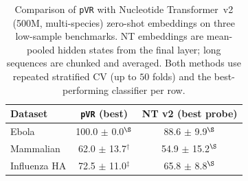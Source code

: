 \begin{table}[t]
\centering
\footnotesize
\caption{Comparison of \texttt{pVR} with Nucleotide Transformer~v2 (500M, multi-species) zero-shot embeddings on three low-sample benchmarks. NT embeddings are mean-pooled hidden states from the final layer; long sequences are chunked and averaged. Both methods use repeated stratified CV (up to $50$ folds) and the best-performing classifier per row.}
\label{tab:nt_compare}
\setlength{\tabcolsep}{4pt}
\begin{tabular}{lcc}
\hline
Dataset & \texttt{pVR} (best) & NT v2 (best probe) \\
\hline
Ebola & 100.0 $\pm$ 0.0$^\S$ & 88.6 $\pm$ 9.9$^\S$ \\
Mammalian & 62.0 $\pm$ 13.7$^\dagger$ & 54.9 $\pm$ 15.2$^\S$ \\
Influenza HA & 72.5 $\pm$ 11.0$^\ddagger$ & 65.8 $\pm$ 8.8$^\S$ \\
\hline
\end{tabular}
\end{table}
